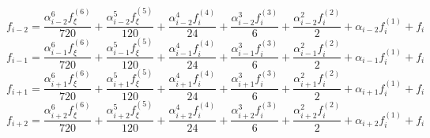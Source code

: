 \begin{equation} 
f_{{i-2}} = \frac{\alpha_{{i-2}}^{6} f^{{(6)}}_{{\xi}}}{720} + \frac{\alpha_{{i-2}}^{5} f^{{(5)}}_{{\xi}}}{120} + \frac{\alpha_{{i-2}}^{4} f^{{(4)}}_{i}}{24} + \frac{\alpha_{{i-2}}^{3} f^{{(3)}}_{i}}{6} + \frac{\alpha_{{i-2}}^{2} f^{{(2)}}_{i}}{2} + \alpha_{{i-2}} f^{{(1)}}_{i} + f_{i}
 \end{equation} 
\begin{equation} 
f_{{i-1}} = \frac{\alpha_{{i-1}}^{6} f^{{(6)}}_{{\xi}}}{720} + \frac{\alpha_{{i-1}}^{5} f^{{(5)}}_{{\xi}}}{120} + \frac{\alpha_{{i-1}}^{4} f^{{(4)}}_{i}}{24} + \frac{\alpha_{{i-1}}^{3} f^{{(3)}}_{i}}{6} + \frac{\alpha_{{i-1}}^{2} f^{{(2)}}_{i}}{2} + \alpha_{{i-1}} f^{{(1)}}_{i} + f_{i}
 \end{equation} 
\begin{equation} 
f_{{i+1}} = \frac{\alpha_{{i+1}}^{6} f^{{(6)}}_{{\xi}}}{720} + \frac{\alpha_{{i+1}}^{5} f^{{(5)}}_{{\xi}}}{120} + \frac{\alpha_{{i+1}}^{4} f^{{(4)}}_{i}}{24} + \frac{\alpha_{{i+1}}^{3} f^{{(3)}}_{i}}{6} + \frac{\alpha_{{i+1}}^{2} f^{{(2)}}_{i}}{2} + \alpha_{{i+1}} f^{{(1)}}_{i} + f_{i}
 \end{equation} 
\begin{equation} 
f_{{i+2}} = \frac{\alpha_{{i+2}}^{6} f^{{(6)}}_{{\xi}}}{720} + \frac{\alpha_{{i+2}}^{5} f^{{(5)}}_{{\xi}}}{120} + \frac{\alpha_{{i+2}}^{4} f^{{(4)}}_{i}}{24} + \frac{\alpha_{{i+2}}^{3} f^{{(3)}}_{i}}{6} + \frac{\alpha_{{i+2}}^{2} f^{{(2)}}_{i}}{2} + \alpha_{{i+2}} f^{{(1)}}_{i} + f_{i}
 \end{equation} 
